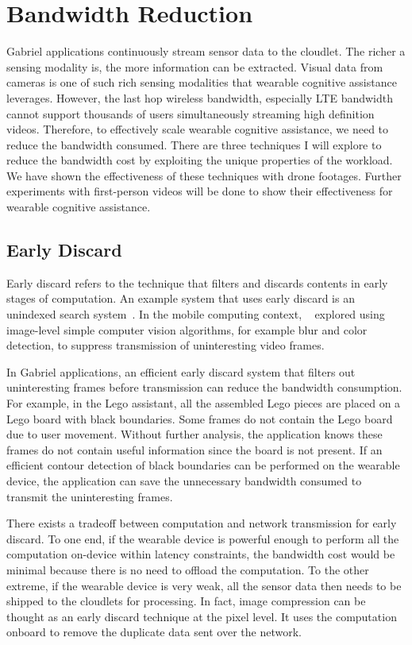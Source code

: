 \section{Bandwidth Reduction}

Gabriel applications continuously stream sensor data to the cloudlet. The richer
a sensing modality is, the more information can be extracted. Visual data from
cameras is one of such rich sensing modalities that wearable cognitive
assistance leverages. However, the last hop wireless bandwidth, especially LTE
bandwidth cannot support thousands of users simultaneously streaming high
definition videos. Therefore, to effectively scale wearable cognitive
assistance, we need to reduce the bandwidth consumed. There are three techniques
I will explore to reduce the bandwidth cost by exploiting the unique properties
of the workload. We have shown the effectiveness of these techniques with drone
footages. Further experiments with first-person videos will be done to show
their effectiveness for wearable cognitive assistance.

\subsection{Early Discard}
Early discard refers to the technique that filters and discards contents in
early stages of computation. An example system that uses early discard is an
unindexed search system~\cite{satyanarayanan2010searching}. In the mobile
computing context, ~\cite{hu2015case} explored using image-level simple computer
vision algorithms, for example blur and color detection, to suppress
transmission of uninteresting video frames.

In Gabriel applications, an efficient early discard system that filters out
uninteresting frames before transmission can reduce the bandwidth consumption.
For example, in the Lego assistant, all the assembled Lego pieces are placed on
a Lego board with black boundaries. Some frames do not contain the Lego board
due to user movement. Without further analysis, the application knows these
frames do not contain useful information since the board is not present. If an
efficient contour detection of black boundaries can be performed on the wearable
device, the application can save the unnecessary bandwidth consumed to transmit
the uninteresting frames.

There exists a tradeoff between computation and network transmission for early
discard. To one end, if the wearable device is powerful enough to perform all
the computation on-device within latency constraints, the bandwidth cost would
be minimal because there is no need to offload the computation. To the other
extreme, if the wearable device is very weak, all the sensor data then needs to
be shipped to the cloudlets for processing. In fact, image compression can be
thought as an early discard technique at the pixel level. It uses the
computation onboard to remove the duplicate data sent over the network.

